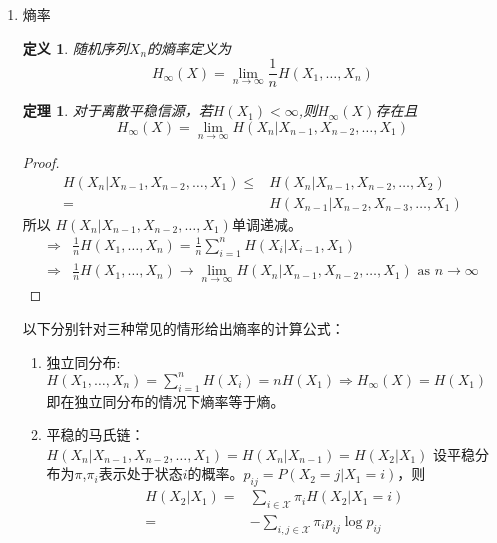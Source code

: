 \documentclass{article}
\newtheorem{definition}{定义}
\newtheorem{thm}{定理}
\begin{document}
\begin{enumerate}
\item 熵率

\begin{definition}
随机序列$X_n$的熵率定义为
\begin{equation}
H_{\infty}(X)=\lim_{n\to \infty} \frac{1}{n} H(X_1,\dots,X_n)
\end{equation}
\end{definition}
\begin{thm}
对于离散平稳信源，若$H(X_1)<\infty$,则$H_{\infty}(X)$存在且
\begin{equation}
H_{\infty}(X)=\lim_{n\to \infty} H(X_n | X_{n-1},X_{n-2},\dots,X_1)
\end{equation}
\end{thm}
\begin{proof}
\begin{align*}
H(X_n | X_{n-1},X_{n-2},\dots,X_1) \leq  & H(X_n | X_{n-1},X_{n-2},\dots,X_2) \\
=& H(X_{n-1} | X_{n-2},X_{n-3},\dots,X_1)
\end{align*}
所以 $H(X_n | X_{n-1},X_{n-2},\dots,X_1)$单调递减。
\begin{align*}
\Rightarrow & \frac{1}{n} H(X_1,\dots,X_n)=\frac{1}{n}\sum_{i=1}^n H(X_i|X_{i-1},X_1) \\
\Rightarrow & \frac{1}{n} H(X_1,\dots,X_n) \to \lim_{n\to \infty}H(X_n | X_{n-1},X_{n-2},\dots,X_1) \text{ as } n\to \infty
\end{align*}
\end{proof}
以下分别针对三种常见的情形给出熵率的计算公式：
\begin{enumerate}[label=(\alph*)]
\item 独立同分布:$H(X_1,\dots,X_n)=\sum_{i=1}^n H(X_i)=nH(X_1) \Rightarrow H_{\infty}(X)=H(X_1)$
即在独立同分布的情况下熵率等于熵。
\item 平稳的马氏链：$H(X_n | X_{n-1},X_{n-2},\dots,X_1)=H(X_n|X_{n-1})=H(X_2|X_1)$
设平稳分布为$\pi$,$\pi_i$表示处于状态$i$的概率。$p_{ij}=P(X_2=j|X_1=i)$，则
\begin{align*}
H(X_2|X_1) = & \sum_{i\in \mathcal{X}} \pi_i H(X_2|X_1=i)\\
= & -\sum_{i,j\in \mathcal{X}} \pi_i p_{ij}\log p_{ij}
\end{align*}


\end{enumerate}
\end{enumerate}
\end{document}
